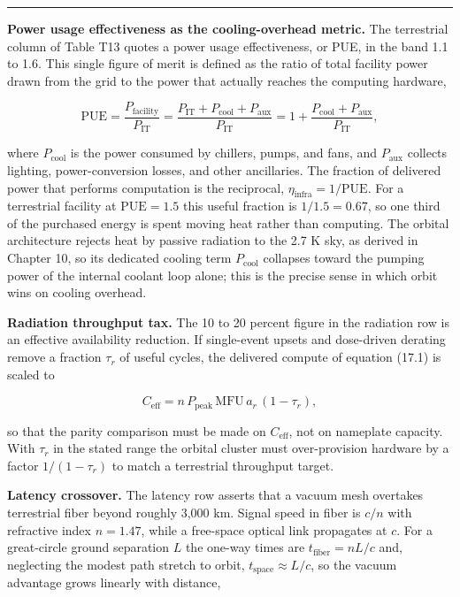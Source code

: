 \documentclass[
  11pt,
  openany,
  oneside]{book}
\begin{document}
\begin{center}\rule{0.5\linewidth}{0.5pt}\end{center}

\textbf{Power usage effectiveness as the cooling-overhead metric.} The
terrestrial column of Table T13 quotes a power usage effectiveness, or
PUE, in the band 1.1 to 1.6. This single figure of merit is defined as
the ratio of total facility power drawn from the grid to the power that
actually reaches the computing hardware,

\begin{equation}
\mathrm{PUE} = \frac{P_{\mathrm{facility}}}{P_{\mathrm{IT}}} = \frac{P_{\mathrm{IT}} + P_{\mathrm{cool}} + P_{\mathrm{aux}}}{P_{\mathrm{IT}}} = 1 + \frac{P_{\mathrm{cool}} + P_{\mathrm{aux}}}{P_{\mathrm{IT}}}, \tag{29.1}
\end{equation}

where \(P_{\mathrm{cool}}\) is the power consumed by chillers, pumps,
and fans, and \(P_{\mathrm{aux}}\) collects lighting, power-conversion
losses, and other ancillaries. The fraction of delivered power that
performs computation is the reciprocal,
\(\eta_{\mathrm{infra}} = 1/\mathrm{PUE}\). For a terrestrial facility
at \(\mathrm{PUE} = 1.5\) this useful fraction is \(1/1.5 = 0.67\), so
one third of the purchased energy is spent moving heat rather than
computing. The orbital architecture rejects heat by passive radiation to
the 2.7 K sky, as derived in Chapter 10, so its dedicated cooling term
\(P_{\mathrm{cool}}\) collapses toward the pumping power of the internal
coolant loop alone; this is the precise sense in which orbit wins on
cooling overhead.

\textbf{Radiation throughput tax.} The 10 to 20 percent figure in the
radiation row is an effective availability reduction. If single-event
upsets and dose-driven derating remove a fraction \(\tau_r\) of useful
cycles, the delivered compute of equation (17.1) is scaled to

\begin{equation}
C_{\mathrm{eff}} = n\,P_{\mathrm{peak}}\,\mathrm{MFU}\,a_r\,(1 - \tau_r), \tag{29.2}
\end{equation}

so that the parity comparison must be made on \(C_{\mathrm{eff}}\), not
on nameplate capacity. With \(\tau_r\) in the stated range the orbital
cluster must over-provision hardware by a factor \(1/(1-\tau_r)\) to
match a terrestrial throughput target.

\textbf{Latency crossover.} The latency row asserts that a vacuum mesh
overtakes terrestrial fiber beyond roughly 3,000 km. Signal speed in
fiber is \(c/n\) with refractive index \(n = 1.47\), while a free-space
optical link propagates at \(c\). For a great-circle ground separation
\(L\) the one-way times are \(t_{\mathrm{fiber}} = nL/c\) and,
neglecting the modest path stretch to orbit,
\(t_{\mathrm{space}} \approx L/c\), so the vacuum advantage grows
linearly with distance,
\end{document}
